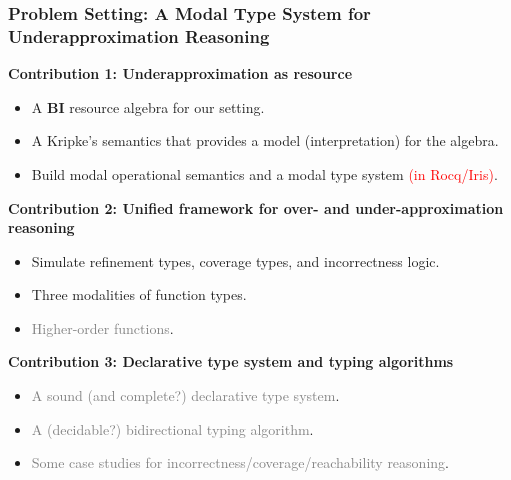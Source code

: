 \begin{frame}[fragile]
    \frametitle{Problem Setting: A Modal Type System for Underapproximation Reasoning}

\textbf{Contribution 1: Underapproximation as resource}
\begin{itemize}
    \item A \textbf{BI} resource algebra for our setting.
    \item A Kripke's semantics that provides a model (interpretation) for the algebra.
    \item Build modal operational semantics and a modal type system \textcolor{red}{(in Rocq/Iris)}.
\end{itemize}

\textbf{Contribution 2: Unified framework for over- and under-approximation reasoning}
\begin{itemize}
    \item Simulate refinement types, coverage types, and incorrectness logic.
    \item Three modalities of function types.
    \item \textcolor{gray}{Higher-order functions}.
\end{itemize}

\textbf{Contribution 3: Declarative type system and typing algorithms}
\begin{itemize}
    \item \textcolor{gray}{ A sound (and complete?) declarative type system}.
    \item \textcolor{gray}{A (decidable?) bidirectional typing algorithm}.
    \item \textcolor{gray}{Some case studies for incorrectness/coverage/reachability reasoning}.
\end{itemize}

\end{frame}

